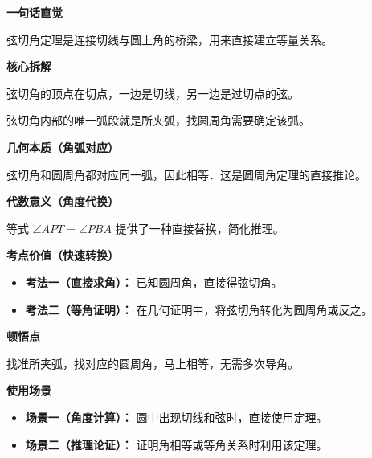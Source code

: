 \begin{explanationbox}
	\textbf{\textcolor{CExplanation}{一句话直觉}}

	弦切角定理是连接切线与圆上角的桥梁，用来直接建立等量关系。

	\medskip
	\textbf{\textcolor{CExplanation}{核心拆解}}
	\begin{description}[style=nextline, leftmargin=2.8em, labelsep=0.5em, itemsep=0.45em]
		\item[\textbf{要点一（角位识别）：}] 弦切角的顶点在切点，一边是切线，另一边是过切点的弦。
		\item[\textbf{要点二（弧的锁定）：}] 弦切角内部的唯一弧段就是所夹弧，找圆周角需要确定该弧。
	\end{description}

	\medskip
	\textbf{\textcolor{CExplanation}{几何本质（角弧对应）}}

	弦切角和圆周角都对应同一弧，因此相等．这是圆周角定理的直接推论。

	\medskip
	\textbf{\textcolor{CExplanation}{代数意义（角度代换）}}

	等式 $\angle APT = \angle PBA$ 提供了一种直接替换，简化推理。

	\medskip
	\textbf{\textcolor{CExplanation}{考点价值（快速转换）}}
	\begin{itemize}[leftmargin=*, itemsep=0.5em, topsep=0.4em]
		\item \textbf{考法一（直接求角）：} 已知圆周角，直接得弦切角。
		\item \textbf{考法二（等角证明）：} 在几何证明中，将弦切角转化为圆周角或反之。
	\end{itemize}

	\medskip
	\textbf{\textcolor{CExplanation}{顿悟点}}

	找准所夹弧，找对应的圆周角，马上相等，无需多次导角。

	\medskip
	\textbf{\textcolor{CExplanation}{使用场景}}
	\begin{itemize}[leftmargin=*, itemsep=0.5em, topsep=0.4em]
		\item \textbf{场景一（角度计算）：} 圆中出现切线和弦时，直接使用定理。
		\item \textbf{场景二（推理论证）：} 证明角相等或等角关系时利用该定理。
	\end{itemize}
\end{explanationbox}
